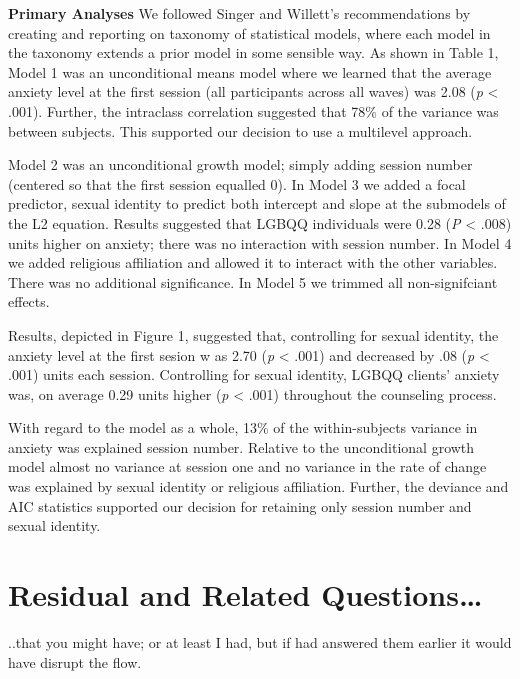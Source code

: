 \documentclass[
  11pt,
]{book}
\begin{document}
\textbf{Primary Analyses}
We followed Singer and Willett's \citep{singer_applied_2003} recommendations by creating and reporting on taxonomy of statistical models, where each model in the taxonomy extends a prior model in some sensible way. As shown in Table 1, Model 1 was an unconditional means model where we learned that the average anxiety level at the first session (all participants across all waves) was 2.08 (\emph{p} \textless{} .001). Further, the intraclass correlation suggested that 78\% of the variance was between subjects. This supported our decision to use a multilevel approach.

Model 2 was an unconditional growth model; simply adding session number (centered so that the first session equalled 0). In Model 3 we added a focal predictor, sexual identity to predict both intercept and slope at the submodels of the L2 equation. Results suggested that LGBQQ individuals were 0.28 (\emph{P} \textless{} .008) units higher on anxiety; there was no interaction with session number. In Model 4 we added religious affiliation and allowed it to interact with the other variables. There was no additional significance. In Model 5 we trimmed all non-signifciant effects.

Results, depicted in Figure 1, suggested that, controlling for sexual identity, the anxiety level at the first sesion w as 2.70 (\emph{p} \textless{} .001) and decreased by .08 (\emph{p} \textless{} .001) units each session. Controlling for sexual identity, LGBQQ clients' anxiety was, on average 0.29 units higher (\emph{p} \textless{} .001) throughout the counseling process.

With regard to the model as a whole, 13\% of the within-subjects variance in anxiety was explained session number. Relative to the unconditional growth model almost no variance at session one and no variance in the rate of change was explained by sexual identity or religious affiliation. Further, the deviance and AIC statistics supported our decision for retaining only session number and sexual identity.

\hypertarget{residual-and-related-questions-2}{%
\section{Residual and Related Questions\ldots{}}\label{residual-and-related-questions-2}}

..that you might have; or at least I had, but if had answered them earlier it would have disrupt the flow.
\end{document}
